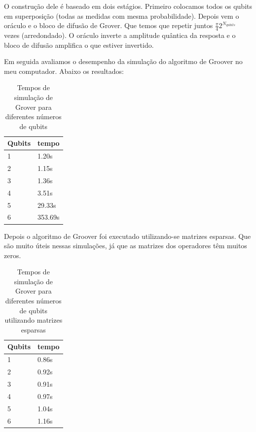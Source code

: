 \documentclass[12pt,a4paper]{article}
\begin{document}
O construção dele é baseado em dois estágios. Primeiro colocamos todos os qubits em superposição (todas as medidas com mesma probabilidade). Depois vem o oráculo e o bloco de difusão de Grover. Que temos que repetir juntos $\frac{\pi}{4} 2^{N_{qubits}}$ vezes (arredondado). O oráculo inverte a amplitude quântica da resposta e o bloco de difusão amplifica o que estiver invertido.

Em seguida avaliamos o desempenho da simulação do algoritmo de Groover no meu computador. Abaixo os resultados:

\begin{table}[htb]

\begin{adjustbox}{center}
\begin{tabular}{|l|l|}  
\hline
Qubits  & tempo \\ \hline
1  & 1.20s \\ \hline
2  &  1.15s\\ \hline
3  &   1.36s\\ \hline
4  &  3.51s\\ \hline
5  &  29.33s\\ \hline
6  &   353.69s\\ \hline

\end{tabular}
\end{adjustbox}
\caption{Tempos de simulação de Grover para diferentes números de qubits}
\end{table}


Depois o algoritmo de Groover foi executado utilizando-se matrizes esparsas. Que são muito úteis nessas simulações, já que as matrizes dos operadores têm muitos zeros.


\begin{table}[htb]
\centering
\begin{adjustbox}{center}
\begin{tabular}{|l|l|}  
\hline
Qubits  & tempo \\ \hline
1  & 0.86s \\ \hline
2  &  0.92s\\ \hline
3  &   0.91s\\ \hline
4  &  0.97s\\ \hline
5  &  1.04s\\ \hline
6  &   1.16s\\ \hline

\end{tabular}
\end{adjustbox}
\caption{Tempos de simulação de Grover para diferentes números de qubits utilizando matrizes esparsas}
\end{table}
\end{document}
